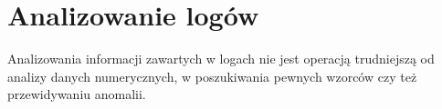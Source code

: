 \section{Analizowanie logów}
\label{chapter:logs:analysis}

Analizowania informacji zawartych w logach nie jest operacją trudniejszą od analizy danych numerycznych, w poszukiwania
pewnych wzorców czy też przewidywaniu anomalii. 